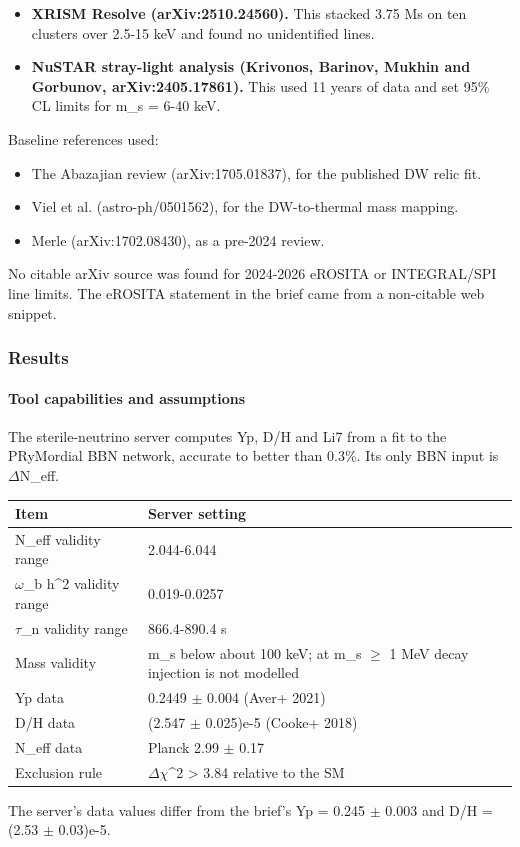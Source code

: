 \documentclass[11pt,a4paper]{article}
\begin{document}
\begin{itemize}
  \item \textbf{XRISM Resolve (arXiv:2510.24560).} This stacked 3.75 Ms on ten clusters over 2.5-15 keV and found no unidentified lines.
  \item \textbf{NuSTAR stray-light analysis (Krivonos, Barinov, Mukhin and Gorbunov, arXiv:2405.17861).} This used 11 years of data and set 95\% CL limits for m\_s = 6-40 keV.
\end{itemize}
Baseline references used:

\begin{itemize}
  \item The Abazajian review (arXiv:1705.01837), for the published DW relic fit.
  \item Viel et al. (astro-ph/0501562), for the DW-to-thermal mass mapping.
  \item Merle (arXiv:1702.08430), as a pre-2024 review.
\end{itemize}
No citable arXiv source was found for 2024-2026 eROSITA or INTEGRAL/SPI line limits. The eROSITA statement in the brief came from a non-citable web snippet.

\subsubsection*{Results}
\paragraph{Tool capabilities and assumptions}
The sterile-neutrino server computes Yp, D/H and Li7 from a fit to the PRyMordial BBN network, accurate to better than 0.3\%. Its only BBN input is $\Delta$N\_eff.

\begin{longtable}{@{}p{}p{}@{}}
\toprule
\textbf{Item} & \textbf{Server setting} \\ \midrule \endhead
N\_eff validity range & 2.044-6.044 \\
$\omega$\_b h\textasciicircum{}2 validity range & 0.019-0.0257 \\
$\tau$\_n validity range & 866.4-890.4 s \\
Mass validity & m\_s below about 100 keV; at m\_s $\geq$ 1 MeV decay injection is not modelled \\
Yp data & 0.2449 $\pm$ 0.004 (Aver+ 2021) \\
D/H data & (2.547 $\pm$ 0.025)e-5 (Cooke+ 2018) \\
N\_eff data & Planck 2.99 $\pm$ 0.17 \\
Exclusion rule & $\Delta$$\chi$\textasciicircum{}2 \textgreater{} 3.84 relative to the SM \\
\bottomrule\end{longtable}
The server's data values differ from the brief's Yp = 0.245 $\pm$ 0.003 and D/H = (2.53 $\pm$ 0.03)e-5.
\end{document}
